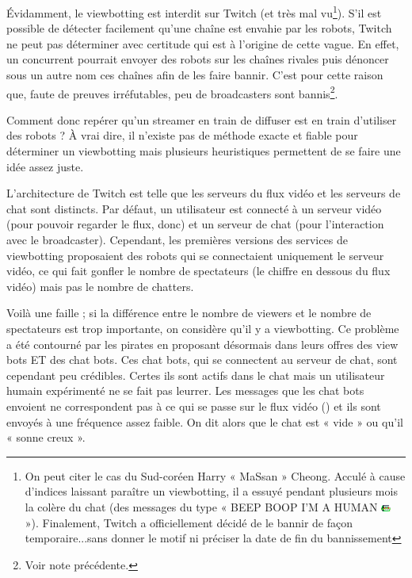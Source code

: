 \documentclass[a4paper]{article}
\begin{document}
Évidamment, le viewbotting est interdit sur Twitch (et très mal vu\footnote{On peut citer le cas du Sud-coréen Harry « MaSsan » Cheong. Acculé à cause d'indices laissant paraître un viewbotting, il a essuyé pendant plusieurs mois la colère du chat (des messages du type « BEEP BOOP I'M A HUMAN \includegraphics[width=0.3cm]{MrDestructoid.png} »). Finalement, Twitch a officiellement décidé de le bannir de façon temporaire...sans donner le motif ni préciser la date de fin du bannissement}). S'il est possible de détecter facilement qu'une chaîne est envahie par les robots, Twitch ne peut pas déterminer avec certitude qui est à l'origine de cette vague. En effet, un concurrent pourrait envoyer des robots sur les chaînes rivales puis dénoncer sous un autre nom ces chaînes afin de les faire bannir. C'est pour cette raison que, faute de preuves irréfutables, peu de broadcasters sont bannis\footnote{Voir note précédente.}.

Comment donc repérer qu'un streamer en train de diffuser est en train d'utiliser des robots ? À vrai dire, il n'existe pas de méthode exacte et fiable pour déterminer un viewbotting mais plusieurs heuristiques permettent de se faire une idée assez juste. 

L'architecture de Twitch est telle que les serveurs du flux vidéo et les serveurs de chat sont distincts. Par défaut, un utilisateur est connecté à un serveur vidéo (pour pouvoir regarder le flux, donc) et un serveur de chat (pour l'interaction avec le broadcaster). Cependant, les premières versions des services de viewbotting proposaient des robots qui se connectaient uniquement le serveur vidéo, ce qui fait gonfler le nombre de spectateurs (le chiffre en dessous du flux vidéo) mais pas le nombre de chatters. 

Voilà une faille ; si la différence entre le nombre de viewers et le nombre de spectateurs est trop importante, on considère qu'il y a viewbotting. Ce problème a été contourné par les pirates en proposant désormais dans leurs offres des view bots ET des chat bots. Ces chat bots, qui se connectent au serveur de chat, sont cependant peu crédibles. Certes ils sont actifs dans le chat mais un utilisateur humain expérimenté ne se fait pas leurrer. Les messages que les chat bots envoient ne correspondent pas à ce qui se passe sur le flux vidéo () et ils sont envoyés à une fréquence assez faible. On dit alors que le chat est « vide » ou qu'il « sonne creux ».
\end{document}
